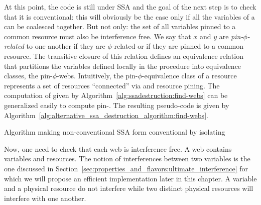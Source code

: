 At this point, the code is still under SSA and the goal of the next step is to check that it is conventional: this will obviously be the case only if all the variables of a \phiweb can be coalesced together. But not only: the set of all variables pinned to a common resource must also be interference free. 
We say that $x$ and $y$ are \emph{pin-$\phi$-related} to one another if they are $\phi$-related or if they are pinned to a common resource. The transitive closure of this relation defines an equivalence relation that 
partitions the variables defined locally in the procedure into equivalence classes, the pin-$\phi$-webs.
Intuitively, the pin-$\phi$-equivalence class of a resource represents a set of resources ``connected'' via \phifuns and resource pining.
The computation of \phiwebs given by Algorithm~\ref{alg:ssadestruction:find-webs} can be generalized easily to compute pin-\phiwebs. The resulting pseudo-code is given by Algorithm~\ref{alg:alternative_ssa_destruction_algorithm:find-webs}. 

\begin{algorithm}[h]
 \caption{\label{alg:alternative_ssa_destruction:sreedhar}Algorithm making 
 non-conventional SSA form conventional by isolating \phinodes}
\end{algorithm}


Now, one need to check that each web is interference free. A web contains variables and resources. The notion of interferences between two variables is the one discussed in Section~\ref{sec:properties_and_flavors:ultimate_interference} for which we will propose an efficient implementation later in this chapter. A variable and a physical resource do not interfere while two distinct physical resources will interfere with one another.

